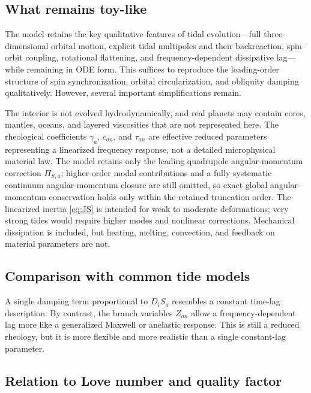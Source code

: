 \documentclass[journal, a4paper]{IEEEtran}
\begin{document}
\subsection{What remains toy-like}

The model retains the key qualitative features of tidal evolution---full
three-dimensional orbital motion, explicit tidal multipoles and their
backreaction, spin--orbit coupling, rotational flattening, and
frequency-dependent dissipative lag---while remaining in ODE form. This
suffices to reproduce the leading-order structure of spin synchronization,
orbital circularization, and obliquity damping qualitatively. However,
several important simplifications remain.

The interior is not evolved hydrodynamically, and real planets may contain
cores, mantles, oceans, and layered viscosities that are not represented
here. The rheological coefficients $\gamma_a$, $c_{an}$, and $\tau_{an}$ are
effective reduced parameters representing a linearized frequency response, not
a detailed microphysical material law. The model retains only the leading
quadrupole angular-momentum correction $\Pi_{S,a}$; higher-order modal
contributions and a fully systematic continuum angular-momentum closure are
still omitted, so exact global angular-momentum conservation holds only within
the retained truncation order. The linearized inertia \eqref{eq:JS} is
intended for weak to moderate deformations; very strong tides would require
higher modes and nonlinear corrections. Mechanical dissipation is included,
but heating, melting, convection, and feedback on material parameters are not.

\subsection{Comparison with common tide models}

A single damping term proportional to $D_t S_a$ resembles a constant
time-lag description. By contrast, the branch variables $Z_{an}$ allow a
frequency-dependent lag more like a generalized Maxwell or anelastic
response. This is still a reduced rheology, but it is more flexible and more
realistic than a single constant-lag parameter.

\subsection{Relation to Love number and quality factor}
\end{document}
